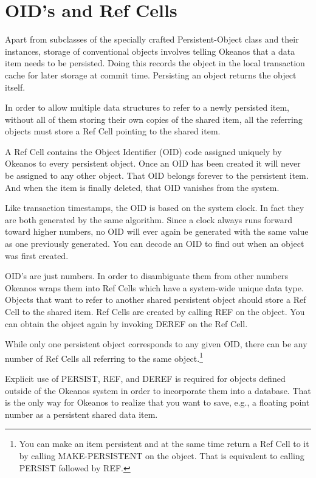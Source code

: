 \documentclass[article,oneside]{memoir}
\begin{document}
\section{OID's and Ref Cells}
\label{oids&refcells}
Apart from subclasses of the specially crafted {\ttfamily Persistent-Object} class and their instances, storage of conventional objects involves telling Okeanos that a data item needs to be persisted. Doing this records the object in the local transaction cache for later storage at commit time. Persisting an object returns the object itself. 

In order to allow multiple data structures to refer to a newly persisted item, without all of them storing their own copies of the shared item, all the referring objects must store a Ref Cell pointing to the shared item.

A Ref Cell contains the Object Identifier (OID) code assigned uniquely by Okeanos to every persistent object. Once an OID has been created it will never be assigned to any other object. That OID belongs forever to the persistent item. And when the item is finally deleted, that OID vanishes from the system.

Like transaction timestamps, the OID is based on the system clock. In fact they are both generated by the same algorithm. Since a clock always runs forward toward higher numbers, no OID will ever again be generated with the same value as one previously generated. You can decode an OID to find out when an object was first created.

OID's are just numbers. In order to disambiguate them from other numbers Okeanos wraps them into Ref Cells which have a system-wide unique data type. Objects that want to refer to another shared persistent object should store a Ref Cell to the shared item. Ref Cells are created by calling {\ttfamily REF} on the object. You can obtain the object again by invoking {\ttfamily DEREF} on the Ref Cell. 

While only one persistent object corresponds to any given OID, there can be any number of Ref Cells all referring to the same object.\footnote{You can make an item persistent and at the same time return a Ref Cell to it by calling {\ttfamily MAKE-PERSISTENT} on the object. That is equivalent to calling {\ttfamily PERSIST} followed by {\ttfamily REF}.}

Explicit use of {\ttfamily PERSIST}, {\ttfamily REF}, and {\ttfamily DEREF} is required for objects defined outside of the Okeanos system in order to incorporate them into a database. That is the only way for Okeanos to realize that you want to save, e.g., a floating point number as a persistent shared data item. 
\end{document}
